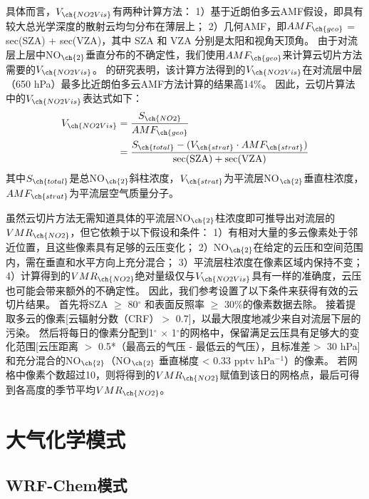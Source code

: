 具体而言，$V_{\ch{NO2Vis}}$有两种计算方法：
1）基于近朗伯多云AMF假设，即具有较大总光学深度的散射云均匀分布在薄层上\citep{Choi.2014}；
2）几何AMF，即$AMF_{\ch{geo}}$ = sec(SZA) + sec(VZA)，其中 SZA 和 VZA 分别是太阳和视角天顶角\citep{Marais.2018,Marais.2021}。
由于对流层上层中NO$_{\ch{2}}$垂直分布的不确定性\citep{Travis.2016}，我们使用$AMF_{\ch{geo}}$来计算云切片方法需要的$V_{\ch{NO2Vis}}$。
\citet{Choi.2014}的研究表明，该计算方法得到的$V_{\ch{NO2Vis}}$在对流层中层（650 hPa）最多比近朗伯多云AMF方法计算的结果高14\%。
因此，云切片算法中的$V_{\ch{NO2Vis}}$表达式如下：
\begin{equation} \label{eq:AMF_geo}
\begin{split}
V_{\ch{NO2Vis}} & = \frac{S_{\ch{NO2}}}{AMF_{\ch{geo}}} \\
             & = \frac{S_{\ch{total}}-(V_{\ch{strat}} \cdot AMF_{\ch{strat}})}{\sec (\mathrm{SZA})+\sec (\mathrm{VZA})}
\end{split}
\end{equation}
其中$S_{\ch{total}}$是总NO$_{\ch{2}}$斜柱浓度，$V_{\ch{strat}}$为平流层NO$_{\ch{2}}$垂直柱浓度，$AMF_{\ch{strat}}$为平流层空气质量分子。


虽然云切片方法无需知道具体的平流层NO$_{\ch{2}}$柱浓度即可推导出对流层的$VMR_{\ch{NO2}}$，但它依赖于以下假设和条件：
1）有相对大量的多云像素处于邻近位置，且这些像素具有足够的云压变化；
2）NO$_{\ch{2}}$在给定的云压和空间范围内，需在垂直和水平方向上充分混合；
3）平流层柱浓度在像素区域内保持不变；
4）计算得到的$VMR_{\ch{NO2}}$绝对量级仅与$V_{\ch{NO2Vis}}$具有一样的准确度，云压也可能会带来额外的不确定性。
因此，我们参考\citet{Marais.2021}设置了以下条件来获得有效的云切片结果。
首先将SZA $\geq$ 80$^{\circ}$ 和表面反照率 $\geq$  30\%的像素数据去除。
接着提取多云的像素[云辐射分数（CRF）$>$ 0.7]，以最大限度地减少来自对流层下层的污染。
然后将每日的像素分配到1$^{\circ}$ $\times$ 1$^{\circ}$的网格中，保留满足云压具有足够大的变化范围[云压距离 $>$ 0.5*（最高云的气压 - 最低云的气压），且标准差$>$ 30 hPa]和充分混合的NO$_{\ch{2}}$（NO$_{\ch{2}}$ 垂直梯度 < 0.33 pptv hPa$^{-1}$）的像素。
若网格中像素个数超过10，则将得到的$VMR_{\ch{NO2}}$赋值到该日的网格点，最后可得到各高度的季节平均$VMR_{\ch{NO2}}$。



\section{大气化学模式}

\subsection{WRF-Chem模式}

